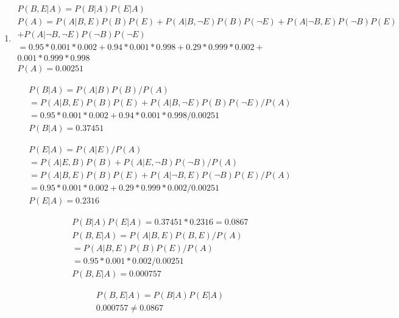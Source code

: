\documentclass[letterpaper, 12pt]{article}
\begin{document}
\begin{enumerate}
\begin{enumerate}
            \item
                  \begin{gather*}
                      P(B,E|A) = P(B|A) P(E|A) \\
                      P(A) = P(A|B,E)P(B)P(E) + P(A|B,\neg E)P(B)P(\neg E)  +  P(A|\neg B,E)P(\neg B)P(E) \\ + P(A| \neg B, \neg E)P(\neg B)P(\neg E) \\
                      =0.95*0.001*0.002+0.94*0.001*0.998+0.29*0.999*0.002+\\0.001*0.999*0.998 \\
                      P(A)=0.00251
                  \end{gather*}

                  \begin{gather*}
                      P(B|A) = P(A|B)P(B)/P(A) \\
                      =P(A|B,E)P(B)P(E) + P(A|B,\neg E)P(B)P(\neg E)/P(A) \\
                      =0.95*0.001*0.002+0.94*0.001*0.998/0.00251 \\
                      P(B|A)=0.37451
                  \end{gather*}

                  \begin{gather*}
                      P(E|A) = P(A|E)/P(A) \\
                      =P(A|E,B)P(B) + P(A|E,\neg B)P(\neg B)/P(A) \\
                      =P(A|B,E)P(B)P(E)+P(A|\neg B,E)P(\neg B)P(E)/P(A) \\
                      =0.95*0.001*0.002+0.29*0.999*0.002/0.00251 \\
                      P(E|A)=0.2316
                  \end{gather*}

                  \begin{gather*}
                      P(B|A)P(E|A)=0.37451*0.2316=0.0867 \\
                      P(B,E|A)=P(A|B,E)P(B,E)/P(A) \\
                      =P(A|B,E)P(B)P(E)/P(A) \\
                      =0.95*0.001*0.002/0.00251 \\
                      P(B,E|A)=0.000757
                  \end{gather*}

                  \begin{gather*}
                      P(B,E|A)=P(B|A)P(E|A) \\
                      0.000757 \neq 0.0867 \\
                  \end{gather*}


\end{enumerate}
\end{enumerate}
\end{document}
